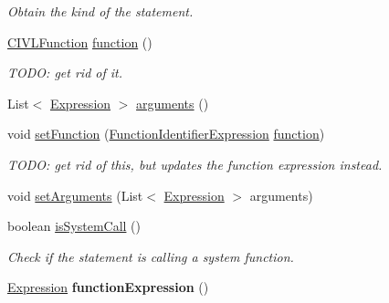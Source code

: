 \begin{DoxyCompactItemize}
\begin{DoxyCompactList}\small\item\em Obtain the kind of the statement. \end{DoxyCompactList}\item 
\hyperlink{interfaceedu_1_1udel_1_1cis_1_1vsl_1_1civl_1_1model_1_1IF_1_1CIVLFunction}{C\+I\+V\+L\+Function} \hyperlink{classedu_1_1udel_1_1cis_1_1vsl_1_1civl_1_1model_1_1common_1_1statement_1_1CommonContractVerifyStatement_a4404508f5a6174aa36d85d78a0c46097}{function} ()
\begin{DoxyCompactList}\small\item\em T\+O\+D\+O\+: get rid of it. \end{DoxyCompactList}\item 
List$<$ \hyperlink{interfaceedu_1_1udel_1_1cis_1_1vsl_1_1civl_1_1model_1_1IF_1_1expression_1_1Expression}{Expression} $>$ \hyperlink{classedu_1_1udel_1_1cis_1_1vsl_1_1civl_1_1model_1_1common_1_1statement_1_1CommonContractVerifyStatement_a5e0274e14e1888eb4be706f0c679f834}{arguments} ()
\item 
void \hyperlink{classedu_1_1udel_1_1cis_1_1vsl_1_1civl_1_1model_1_1common_1_1statement_1_1CommonContractVerifyStatement_a61fca967900527462b7cf28da74b46cc}{set\+Function} (\hyperlink{interfaceedu_1_1udel_1_1cis_1_1vsl_1_1civl_1_1model_1_1IF_1_1expression_1_1FunctionIdentifierExpression}{Function\+Identifier\+Expression} \hyperlink{classedu_1_1udel_1_1cis_1_1vsl_1_1civl_1_1model_1_1common_1_1statement_1_1CommonContractVerifyStatement_a4404508f5a6174aa36d85d78a0c46097}{function})
\begin{DoxyCompactList}\small\item\em T\+O\+D\+O\+: get rid of this, but updates the function expression instead. \end{DoxyCompactList}\item 
void \hyperlink{classedu_1_1udel_1_1cis_1_1vsl_1_1civl_1_1model_1_1common_1_1statement_1_1CommonContractVerifyStatement_ae062d171ddb1806f7b74cd445ea430a1}{set\+Arguments} (List$<$ \hyperlink{interfaceedu_1_1udel_1_1cis_1_1vsl_1_1civl_1_1model_1_1IF_1_1expression_1_1Expression}{Expression} $>$ arguments)
\item 
boolean \hyperlink{classedu_1_1udel_1_1cis_1_1vsl_1_1civl_1_1model_1_1common_1_1statement_1_1CommonContractVerifyStatement_af27b8e29a6550520003e575acb6cfe32}{is\+System\+Call} ()
\begin{DoxyCompactList}\small\item\em Check if the statement is calling a system function. \end{DoxyCompactList}\item 
\hypertarget{classedu_1_1udel_1_1cis_1_1vsl_1_1civl_1_1model_1_1common_1_1statement_1_1CommonContractVerifyStatement_a7607c61d31a0b0e04124efc3eae18a7d}{}\hyperlink{interfaceedu_1_1udel_1_1cis_1_1vsl_1_1civl_1_1model_1_1IF_1_1expression_1_1Expression}{Expression} {\bfseries function\+Expression} ()\label{classedu_1_1udel_1_1cis_1_1vsl_1_1civl_1_1model_1_1common_1_1statement_1_1CommonContractVerifyStatement_a7607c61d31a0b0e04124efc3eae18a7d}


\end{DoxyCompactItemize}
